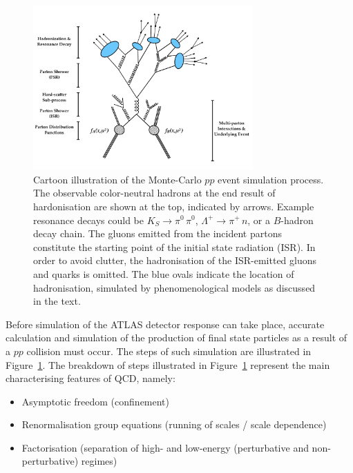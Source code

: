 \begin{figure}[!htb]
    \begin{center}
        \includegraphics[width=0.75\textwidth]{figures/event_simulation/pp_sim_cartoonPDF}
        \caption{
            Cartoon illustration of the Monte-Carlo $pp$ event simulation process.
            The observable color-neutral hadrons at the end result of hardonisation are shown at the
            top, indicated by arrows.
            Example resonance decays could be $K_S \rightarrow \pi^0\,\pi^0$, $\Lambda^+ \rightarrow \pi^+\,n$, or a
            $B$-hadron decay chain.
            The gluons emitted from the incident partons constitute the starting point of the initial state radiation (ISR).
            In order to avoid clutter, the hadronisation of the ISR-emitted gluons and quarks is omitted.
            The blue ovals indicate the location of hadronisation, simulated by phenomenological models as discussed in the text.
        }
        \label{fig:pp_sim_steps}
    \end{center}
\end{figure}

Before simulation of the ATLAS detector response can take place, accurate calculation and simulation of the production of final
state particles as a result of a $pp$ collision must occur.
The steps of such simulation are illustrated in Figure~\ref{fig:pp_sim_steps}.
The breakdown of steps illustrated in Figure~\ref{fig:pp_sim_steps} represent the main characterising features
of QCD, namely: 
\begin{itemize}
    \item Asymptotic freedom (confinement)
    \item Renormalisation group equations (running of scales / scale dependence)
    \item Factorisation (separation of high- and low-energy (perturbative and non-perturbative) regimes)
\end{itemize}

